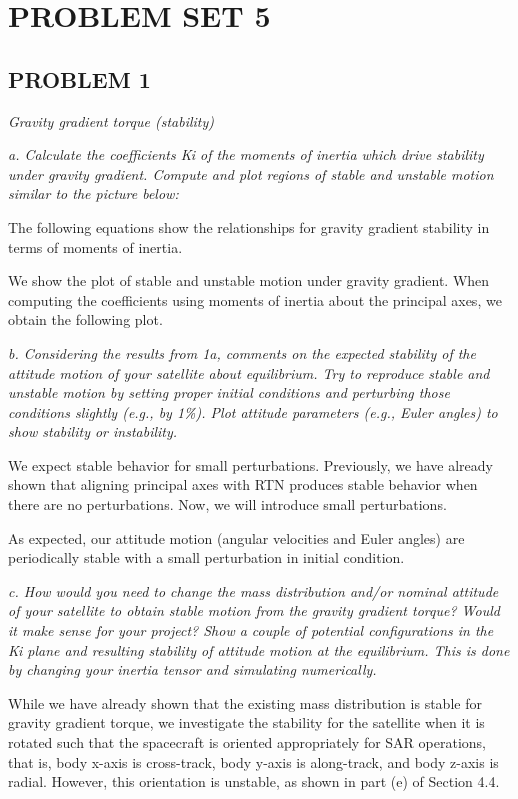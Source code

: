 \section{\Large PROBLEM SET 5}
\subsection{PROBLEM 1}
\textit{Gravity gradient torque (stability)}

\textit{a. Calculate the coefficients Ki of the moments of inertia which drive stability under gravity gradient. Compute and plot regions of stable and unstable motion similar to the picture below:}

The following equations show the relationships for gravity gradient stability in terms of moments of inertia.


We show the plot of stable and unstable motion under gravity gradient. When computing the coefficients using moments of inertia about the principal axes, we obtain the following plot.


\textit{b. Considering the results from 1a, comments on the expected stability of the attitude motion of your satellite about equilibrium. Try to reproduce stable and unstable motion by setting proper initial conditions and perturbing those conditions slightly (e.g., by 1\%). Plot attitude parameters (e.g., Euler angles) to show stability or instability.}

We expect stable behavior for small perturbations. Previously, we have already shown that aligning principal axes with RTN produces stable behavior when there are no perturbations. Now, we will introduce small perturbations.

As expected, our attitude motion (angular velocities and Euler angles) are periodically stable with a small perturbation in initial condition.


\textit{c. How would you need to change the mass distribution and/or nominal attitude of your satellite to obtain stable motion from the gravity gradient torque? Would it make sense for your project? Show a couple of potential configurations in the Ki plane and resulting stability of attitude motion at the equilibrium. This is done by changing your inertia tensor and simulating numerically.}

While we have already shown that the existing mass distribution is stable for gravity gradient torque, we investigate the stability for the satellite when it is rotated such that the spacecraft is oriented appropriately for SAR operations, that is, body x-axis is cross-track, body y-axis is along-track, and body z-axis is radial. However, this orientation is unstable, as shown in part (e) of Section 4.4.

